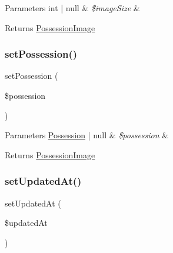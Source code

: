 \begin{DoxyParams}[1]{Parameters}
int | null & {\em \$image\+Size} & \\
\hline
\end{DoxyParams}
\begin{DoxyReturn}{Returns}
\mbox{\hyperlink{class_app_1_1_entity_1_1_possession_image}{Possession\+Image}} 
\end{DoxyReturn}
\mbox{\label{class_app_1_1_entity_1_1_possession_image_ad625cd7a23ddbd219c5f6b58e85f2977}} 
\subsubsection{\texorpdfstring{setPossession()}{setPossession()}}
{\footnotesize\ttfamily set\+Possession (\begin{DoxyParamCaption}\item[{?\mbox{\hyperlink{class_app_1_1_entity_1_1_possession}{Possession}}}]{\$possession }\end{DoxyParamCaption})}


\begin{DoxyParams}[1]{Parameters}
\mbox{\hyperlink{class_app_1_1_entity_1_1_possession}{Possession}} | null & {\em \$possession} & \\
\hline
\end{DoxyParams}
\begin{DoxyReturn}{Returns}
\mbox{\hyperlink{class_app_1_1_entity_1_1_possession_image}{Possession\+Image}} 
\end{DoxyReturn}
\mbox{\label{class_app_1_1_entity_1_1_possession_image_aa43d960f580739f26eb6ac18ce384ed7}} 
\subsubsection{\texorpdfstring{setUpdatedAt()}{setUpdatedAt()}}
{\footnotesize\ttfamily set\+Updated\+At (\begin{DoxyParamCaption}\item[{?\textbackslash{}Date\+Time\+Interface}]{\$updated\+At }\end{DoxyParamCaption})}


